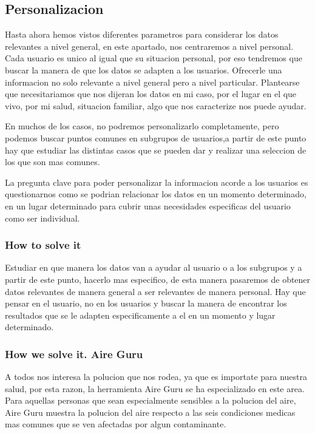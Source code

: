 \subsection{Personalizacion}
Hasta ahora hemos vistos diferentes parametros para considerar los datos relevantes a nivel general, en este apartado, nos
centraremos a nivel personal.
Cada usuario es unico al igual que su situacion personal, por eso tendremos que buscar la manera de que los datos se 
adapten a los usuarios. Ofrecerle una informacion no solo relevante a nivel general pero a nivel particular.
Plantearse que necesitariamos que nos dijeran los datos en mi caso, por el lugar en el que vivo, por
mi salud, situacion familiar, algo que nos caracterize nos puede ayudar.

En muchos de los casos, no podremos personalizarlo completamente, pero podemos buscar puntos comunes en subgrupos de 
usuarios,a partir de este punto hay que estudiar las distintas casos que se pueden dar y realizar una seleccion de los que son 
mas comunes.

La pregunta clave para poder personalizar la informacion acorde a los usuarios es questionarnos como se podrian 
relacionar los datos en un momento determinado, en un lugar determinado para cubrir unas necesidades especificas del
usuario como ser individual.

\subsubsection{How to solve it} 

 Estudiar en que manera los datos van a ayudar al usuario o a los subgrupos y a partir de este punto, hacerlo mas especifico, de esta manera
 pasaremos de obtener datos relevantes de manera general a ser relevantes de manera personal. Hay que pensar en el 
 usuario, no en los usuarios y buscar la manera de encontrar los resultados que se le adapten especificamente a el en un
 momento y lugar determinado.


 \subsubsection{How we solve it. Aire Guru} 
A todos nos interesa la polucion que nos rodea, ya que es importate para nuestra salud, por esta razon, la herramienta
Aire Guru se ha especializado en este area. Para aquellas personas que sean especialmente sensibles a la polucion del
aire, Aire Guru muestra la polucion del aire respecto a las seis condiciones medicas mas comunes que 
se ven afectadas por algun contaminante.
 

